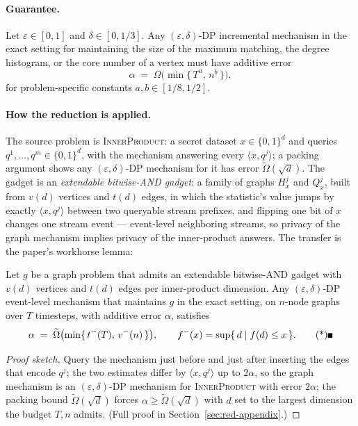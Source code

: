 \paragraph{Guarantee.}

\begin{theorem}\label{thm:red-continual}
Let $\varepsilon \in [0,1]$ and $\delta \in [0,1/3]$. Any $(\varepsilon, \delta)$-DP
incremental mechanism in the exact setting for maintaining the size of the maximum
matching, the degree histogram, or the core number of a vertex must have additive error
\[
\alpha \;=\; \Omega\bigl(\min\{\, T^{a},\, n^{b} \,\}\bigr),
\]
for problem-specific constants $a, b \in [1/8, 1/2]$. \eop
\end{theorem}

\paragraph{How the reduction is applied.}
The source problem is \textsc{InnerProduct}: a secret dataset $x \in \{0,1\}^d$ and
queries $q^1, \dots, q^m \in \{0,1\}^d$, with the mechanism answering every
$\langle x, q^j \rangle$; a packing argument shows any $(\varepsilon,\delta)$-DP
mechanism for it has error $\widetilde{\Omega}(\sqrt{d})$. The gadget is an
\emph{extendable bitwise-AND gadget}: a family of graphs $H_{x}^{j}$ and $Q_{x}^{j}$,
built from $v(d)$ vertices and $t(d)$ edges, in which the statistic's value jumps by
exactly $\langle x, q^j\rangle$ between two queryable stream prefixes, and flipping one
bit of $x$ changes one stream event --- event-level neighboring streams, so privacy of
the graph mechanism implies privacy of the inner-product answers. The transfer is the
paper's workhorse lemma:

\begin{lemma}\label{lem:red-gadget}
Let $g$ be a graph problem that admits an extendable bitwise-AND gadget with $v(d)$
vertices and $t(d)$ edges per inner-product dimension. Any $(\varepsilon, \delta)$-DP
event-level mechanism that maintains $g$ in the exact setting, on $n$-node graphs over
$T$ timesteps, with additive error $\alpha$, satisfies
\[
\alpha \;=\; \widetilde{\Omega}\bigl(\min\{\, t^{-}(T),\, v^{-}(n) \,\}\bigr),
\qquad f^{-}(x) = \sup\{\, d \mid f(d) \le x \,\}. \eopm
\]
\end{lemma}

\begin{proof}[Proof sketch]
Query the mechanism just before and just after inserting the edges that encode $q^j$;
the two estimates differ by $\langle x, q^j \rangle$ up to $2\alpha$, so the graph
mechanism is an $(\varepsilon,\delta)$-DP mechanism for \textsc{InnerProduct} with
error $2\alpha$; the packing bound $\widetilde{\Omega}(\sqrt d)$ forces $\alpha \ge
\widetilde{\Omega}(\sqrt d)$ with $d$ set to the largest dimension the budget
$T, n$ admits. (Full proof in Section~\ref{sec:red-appendix}.)
\end{proof}


